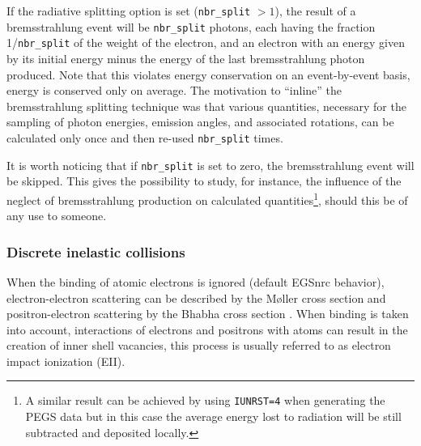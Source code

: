 If the radiative splitting option is set ({\tt nbr\_split} $> 1$),
the result of a bremsstrahlung event will be {\tt nbr\_split}
photons, each having the fraction 1/{\tt nbr\_split} of
the weight of the electron, and an electron with an
energy given by its initial energy minus the energy of
the last bremsstrahlung photon produced. Note that
this violates energy conservation on an event-by-event
basis, energy is conserved only on average. The
motivation to ``inline'' the bremsstrahlung splitting technique
was that various quantities, necessary for the sampling
of photon energies, emission angles, and associated
rotations, can be calculated only once and then re-used
{\tt  nbr\_split} times.

It is worth noticing that if {\tt nbr\_split} is set
to zero, the bremsstrahlung event will be skipped.
This gives the possibility to study, for instance, the
influence of the neglect of bremsstrahlung production
on calculated quantities\footnote{A similar result
can be achieved by using {\tt IUNRST=4} when generating
the PEGS data but in this case the average energy lost to radiation
will be still subtracted and deposited locally.}, should
this be of any use to someone.

\subsubsection{Discrete inelastic collisions}
\label{discrete_inel}
\setcounter{equation}{0}


When the binding of atomic electrons is ignored (default EGSnrc behavior),
electron-electron scattering can be described by the
M{\o}ller cross section \cite{Mo32a} and
positron-electron scattering by the Bhabha cross section
\cite{Bh35}. When binding is taken into account, interactions of
electrons and positrons with atoms can result in the creation of inner
shell vacancies, this process is usually referred to as electron impact
ionization (EII).

